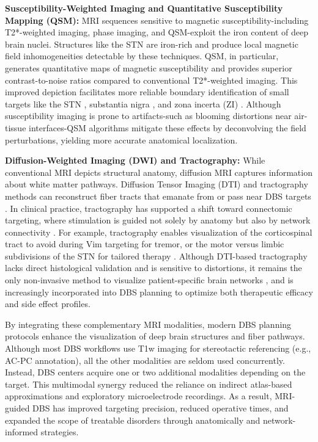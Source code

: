 \textbf{Susceptibility-Weighted Imaging and Quantitative Susceptibility Mapping (QSM):} MRI sequences sensitive to magnetic susceptibility-including T2*-weighted imaging, phase imaging, and QSM-exploit the iron content of deep brain nuclei. Structures like the STN are iron-rich and produce local magnetic field inhomogeneities detectable by these techniques. QSM, in particular, generates quantitative maps of magnetic susceptibility and provides superior contrast-to-noise ratios compared to conventional T2*-weighted imaging. This improved depiction facilitates more reliable boundary identification of small targets like the STN \cite{Liu2013-zm}, substantia nigra \cite{Chen2021-tj}, and zona incerta (ZI) \cite{Lau2020-dh} . Although susceptibility imaging is prone to artifacts-such as blooming distortions near air-tissue interfaces-QSM algorithms mitigate these effects by deconvolving the field perturbations, yielding more accurate anatomical localization.

\textbf{Diffusion-Weighted Imaging (DWI) and Tractography:} While conventional MRI depicts structural anatomy, diffusion MRI captures information about white matter pathways. Diffusion Tensor Imaging (DTI) and tractography methods can reconstruct fiber tracts that emanate from or pass near DBS targets \cite{Rodrigues2018-jt}. In clinical practice, tractography has supported a shift toward connectomic targeting, where stimulation is guided not solely by anatomy but also by network connectivity \cite{Horn2020-wf}. For example, tractography enables visualization of the corticospinal tract to avoid during Vim targeting for tremor, or the motor versus limbic subdivisions of the STN for tailored therapy \cite{Calabrese2016-xi}. Although DTI-based tractography lacks direct histological validation and is sensitive to distortions, it remains the only non-invasive method to visualize patient-specific brain networks \cite{Coenen2016-pd}, and is increasingly incorporated into DBS planning to optimize both therapeutic efficacy and side effect profiles.

By integrating these complementary MRI modalities, modern DBS planning protocols enhance the visualization of deep brain structures and fiber pathways. Although most DBS workflows use T1w imaging for stereotactic referencing (e.g., AC-PC annotation), all the other modalities are seldom used concurrently. Instead, DBS centers acquire one or two additional modalities depending on the target. This multimodal synergy reduced the reliance on indirect atlas-based approximations and exploratory microelectrode recordings. As a result, MRI-guided DBS has improved targeting precision, reduced operative times, and expanded the scope of treatable disorders through anatomically and network-informed strategies.

